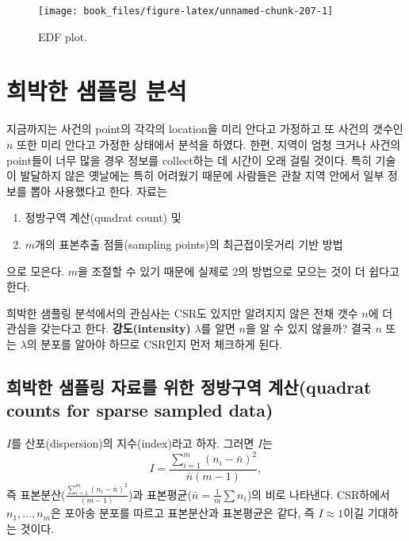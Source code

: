 \documentclass[b5paper,]{book}
\theoremstyle{definition}
\theoremstyle{definition}
\theoremstyle{definition}
\theoremstyle{remark}
\begin{document}
\begin{figure}

{\centering \texttt{[image: book\_files/figure-latex/unnamed-chunk-207-1]} 

}

\caption{EDF plot.}\label{fig:unnamed-chunk-207}
\end{figure}

\chapter{희박한 샘플링 분석}\label{sparsesampling}

지금까지는 사건의 point의 각각의 location을 미리 안다고 가정하고 또
사건의 갯수인 \(n\) 또한 미리 안다고 가정한 상태에서 분석을 하였다.
한편, 지역이 엄청 크거나 사건의 point들이 너무 많을 경우 정보를
collect하는 데 시간이 오래 걸릴 것이다. 특히 기술이 발달하지 않은
옛날에는 특히 어려웠기 때문에 사람들은 관찰 지역 안에서 일부 정보를 뽑아
사용했다고 한다. 자료는

\begin{enumerate}
\def\labelenumi{\arabic{enumi}.}
\item
  정방구역 계산(quadrat count) 및
\item
  \(m\)개의 표본추출 점들(sampling points)의 최근접이웃거리 기반 방법
\end{enumerate}

으로 모은다. \(m\)을 조절할 수 있기 때문에 실제로 2의 방법으로 모으는
것이 더 쉽다고 한다.

희박한 샘플링 분석에서의 관심사는 CSR도 있지만 알려지지 않은 전채 갯수
\(n\)에 더 관심을 갖는다고 한다. \textbf{강도(intensity)} \(\lambda\)를
알면 \(n\)을 알 수 있지 않을까? 결국 \(n\) 또는 \(\lambda\)의 분포를
알아야 하므로 CSR인지 먼저 체크하게 된다.

\section{희박한 샘플링 자료를 위한 정방구역 계산(quadrat counts for
sparse sampled data)}\label{-----quadrat-counts-for-sparse-sampled-data}

\(I\)를 산포(dispersion)의 지수(index)라고 하자. 그러면 \(I\)는
\[I=\frac{\sum_{i=1}^{m}(n_{i}-\bar{n})^{2}}{\bar{n}(m-1)},\] 즉
표본분산(\(\frac{\sum_{i=1}^{m}(n_{i}-\bar{n})^{2}}{(m-1)}\))과
표본평균(\(\bar{n}=\frac{1}{m}\sum n_{i}\))의 비로 나타낸다. CSR하에서
\(n_{1}, \ldots, n_{m}\)은 포아송 분포를 따르고 표본분산과 표본평균은
같다, 즉 \(I \approx 1\)이길 기대하는 것이다.
\end{document}
